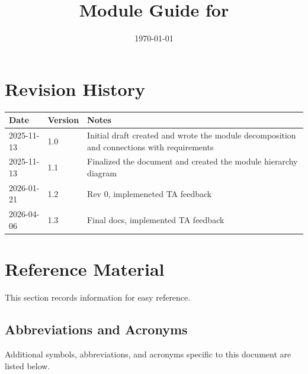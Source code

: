 \documentclass[12pt, titlepage]{article}
\begin{document}
\title{Module Guide for \progname{}} 
\author{\authname}
\date{\today}

\maketitle


\section{Revision History}

\begin{tabularx}{\textwidth}{p{3cm}p{2cm}X}
\toprule {\bf Date} & {\bf Version} & {\bf Notes}\\
\midrule
2025-11-13 & 1.0 & Initial draft created and wrote the module decomposition
                and connections with requirements\\
2025-11-13 & 1.1 & Finalized the document and created the module hierarchy
                diagram \\
2026-01-21 & 1.2 & Rev 0, implemeneted TA feedback \\
2026-04-06 & 1.3 & Final docs, implemented TA feedback \\
\bottomrule
\end{tabularx}

\newpage

\section{Reference Material}

This section records information for easy reference.

\subsection{Abbreviations and Acronyms}

\noindent Additional symbols, abbreviations, and acronyms specific to this
document are listed below.
\end{document}
